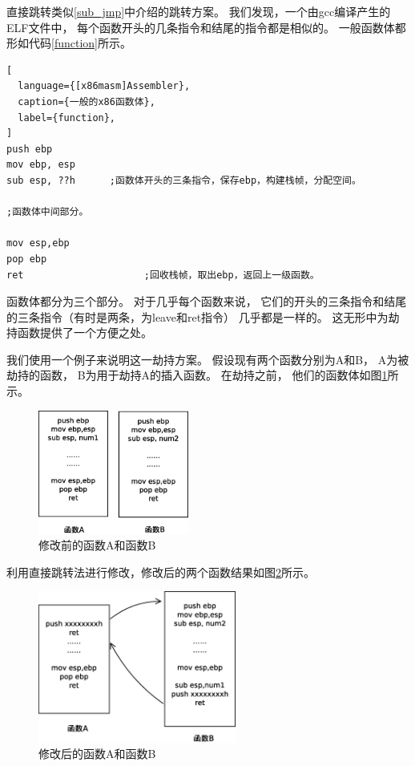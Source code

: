 直接跳转类似\ref{sub_jmp}中介绍的跳转方案。
我们发现，一个由gcc编译产生的ELF文件中，
每个函数开头的几条指令和结尾的指令都是相似的。
一般函数体都形如代码\ref{function}所示。

\begin{lstlisting}[
  language={[x86masm]Assembler},
  caption={一般的x86函数体},
  label={function},
]
push ebp
mov ebp, esp
sub esp, ??h      ;函数体开头的三条指令，保存ebp，构建栈帧，分配空间。

;函数体中间部分。

mov esp,ebp
pop ebp
ret                     ;回收栈帧，取出ebp，返回上一级函数。
\end{lstlisting}

函数体都分为三个部分。
对于几乎每个函数来说，
它们的开头的三条指令和结尾的三条指令（有时是两条，为leave和ret指令）
几乎都是一样的。
这无形中为劫持函数提供了一个方便之处。

我们使用一个例子来说明这一劫持方案。
假设现有两个函数分别为A和B，
A为被劫持的函数，
B为用于劫持A的插入函数。
在劫持之前，
他们的函数体如图\ref{ab0}所示。

\begin{figure}[h!]
    \centering
    \includegraphics[width=0.44\textwidth]{figure/ab0.eps}
    \caption{修改前的函数A和函数B}
    \label{ab0}
\end{figure}

利用直接跳转法进行修改，修改后的两个函数结果如图\ref{ab1}所示。

\begin{figure}[h!]
    \centering
    \includegraphics[width=0.58\textwidth]{figure/ab1.eps}
    \caption{修改后的函数A和函数B}
    \label{ab1}
\end{figure}

